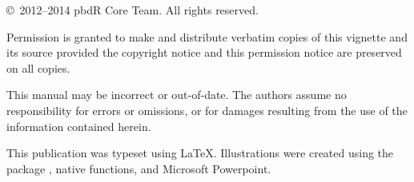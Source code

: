 \null
\vfill

\copyright\ 2012--2014 pbdR Core Team.  All rights reserved.

Permission is granted to make and distribute verbatim copies of this vignette
and its source provided the copyright notice and this permission notice are
preserved on all copies.

This manual may be incorrect or out-of-date.  The authors assume
no responsibility for errors or omissions, or for damages resulting
from the use of the information contained herein.

This publication was typeset using \LaTeX. Illustrations were created
using the  package \citep{ggplot2}, native  functions,
and Microsoft Powerpoint.
